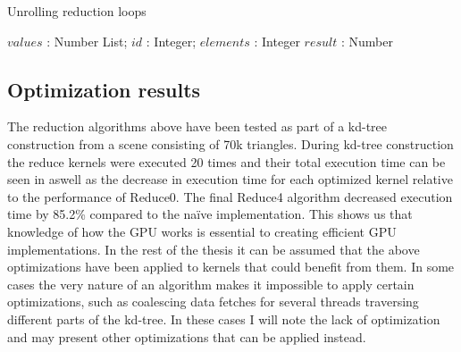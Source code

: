 \begin{algorithm}
  \caption{Unrolling reduction loops}
  \label{alg:unrollReduct}
  \begin{algorithmic}
              {$values$ : Number List; $id$ : Integer; $elements$ : Integer}
              {$result$ : Number}
              {
                \SYNC
                  \ENDIF
                  \SYNC
                \ENDWHILE
                \ENDIF
              }
  \end{algorithmic}
\end{algorithm}

\subsection{Optimization results}\label{sec:optimizationResults}

The reduction algorithms above have been tested as part of a kd-tree
construction from a scene consisting of 70k triangles. During kd-tree
construction the reduce kernels were executed 20 times and their total execution
time can be seen in  aswell as the decrease in
execution time for each optimized kernel relative to the performance of
Reduce0. The final Reduce4 algorithm decreased execution time by 85.2\% compared
to the naïve implementation. This shows us that knowledge of how the GPU works
is essential to creating efficient GPU implementations. In the rest of the
thesis it can be assumed that the above optimizations have been applied to
kernels that could benefit from them. In some cases the very nature of an
algorithm makes it impossible to apply certain optimizations, such as coalescing
data fetches for several threads traversing different parts of the kd-tree. In
these cases I will note the lack of optimization and may present other
optimizations that can be applied instead.

